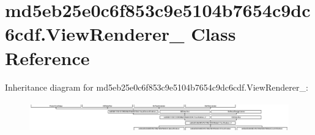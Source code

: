 \hypertarget{classmd5eb25e0c6f853c9e5104b7654c9dc6cdf_1_1ViewRenderer__2}{}\section{md5eb25e0c6f853c9e5104b7654c9dc6cdf.\+View\+Renderer\+\_ Class Reference}
\label{classmd5eb25e0c6f853c9e5104b7654c9dc6cdf_1_1ViewRenderer__2}
Inheritance diagram for md5eb25e0c6f853c9e5104b7654c9dc6cdf.\+View\+Renderer\+\_\+:\begin{figure}[H]
\begin{center}
\leavevmode
\includegraphics[height=1.372549cm]{classmd5eb25e0c6f853c9e5104b7654c9dc6cdf_1_1ViewRenderer__2}
\end{center}
\end{figure}
